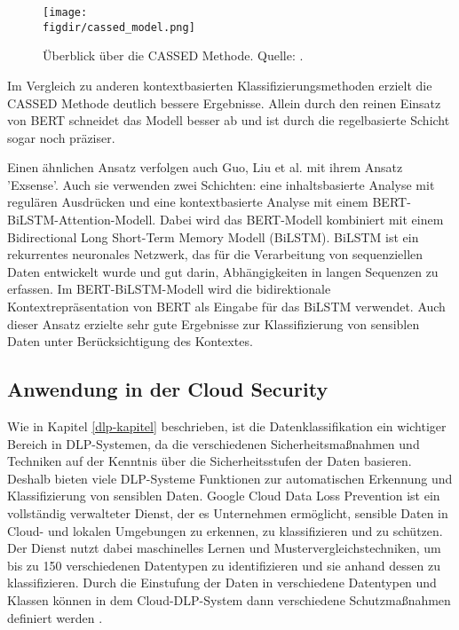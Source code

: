 \begin{figure}[htbp]
    \centering
    \texttt{[image: \\figdir/cassed\_model.png]}
    \caption{Überblick über die CASSED Methode. Quelle: \cite{Kuzina.2023}.}
    \label{f:cassed}
\end{figure}

Im Vergleich zu anderen kontextbasierten Klassifizierungsmethoden erzielt die CASSED Methode deutlich bessere Ergebnisse. Allein durch den reinen Einsatz von BERT schneidet das Modell besser ab und ist durch die regelbasierte Schicht sogar noch präziser.

Einen ähnlichen Ansatz verfolgen auch Guo, Liu et al. \cite{Guo.2021} mit ihrem Ansatz 'Exsense'. Auch sie verwenden zwei Schichten: eine inhaltsbasierte Analyse mit regulären Ausdrücken und eine kontextbasierte Analyse mit einem BERT-BiLSTM-Attention-Modell. Dabei wird das BERT-Modell kombiniert mit einem Bidirectional Long Short-Term Memory Modell (BiLSTM). BiLSTM ist ein rekurrentes neuronales Netzwerk, das für die Verarbeitung von sequenziellen Daten entwickelt wurde und gut darin, Abhängigkeiten in langen Sequenzen zu erfassen. Im BERT-BiLSTM-Modell wird die bidirektionale Kontextrepräsentation von BERT als Eingabe für das BiLSTM verwendet. Auch dieser Ansatz erzielte sehr gute Ergebnisse zur Klassifizierung von sensiblen Daten unter Berücksichtigung des Kontextes.



\subsection{Anwendung in der Cloud Security}
Wie in Kapitel \ref{dlp-kapitel} beschrieben, ist die Datenklassifikation ein wichtiger Bereich in DLP-Systemen, da die verschiedenen Sicherheitsmaßnahmen und Techniken auf der Kenntnis über die Sicherheitsstufen der Daten basieren. Deshalb bieten viele DLP-Systeme Funktionen zur automatischen Erkennung und Klassifizierung von sensiblen Daten.
Google Cloud Data Loss Prevention ist ein vollständig verwalteter Dienst, der es Unternehmen ermöglicht, sensible Daten in Cloud- und lokalen Umgebungen zu erkennen, zu klassifizieren und zu schützen. Der Dienst nutzt dabei maschinelles Lernen und Mustervergleichstechniken, um bis zu 150 verschiedenen Datentypen zu identifizieren und sie anhand dessen zu klassifizieren. Durch die Einstufung der Daten in verschiedene Datentypen und Klassen können in dem Cloud-DLP-System dann verschiedene Schutzmaßnahmen definiert werden \cite{GoogleCloud.30.11.2023}.

